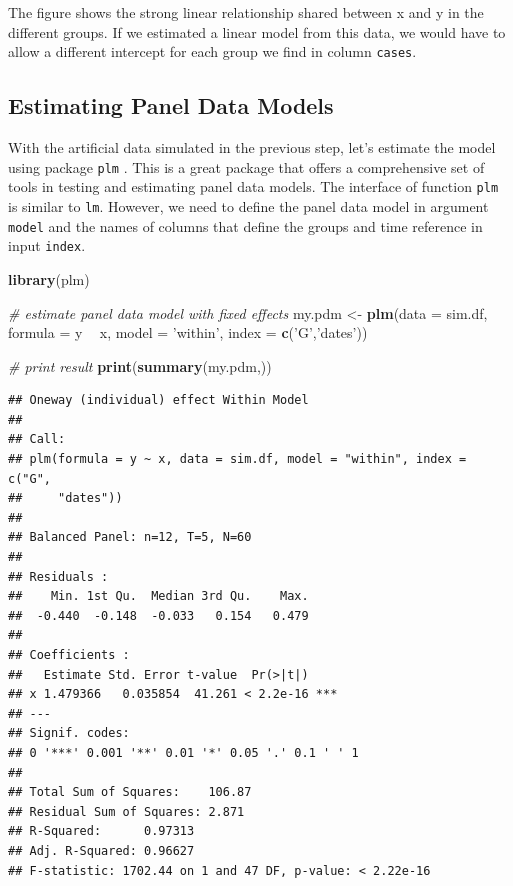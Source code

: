 \documentclass[11pt,]{book}
\newenvironment{Shaded}{\begin{snugshade}}{\end{snugshade}}
\newcommand{\KeywordTok}[1]{\textcolor[rgb]{0.27,0.27,0.27}{\textbf{#1}}}
\newcommand{\DataTypeTok}[1]{\textcolor[rgb]{0.27,0.27,0.27}{#1}}
\newcommand{\StringTok}[1]{\textcolor[rgb]{0.5,0.5,0.5}{#1}}
\newcommand{\CommentTok}[1]{\textcolor[rgb]{0.56,0.35,0.01}{\textit{#1}}}
\newcommand{\OperatorTok}[1]{\textcolor[rgb]{0.81,0.36,0.00}{\textbf{#1}}}
\newcommand{\NormalTok}[1]{#1}
\begin{document}
The figure shows the strong linear relationship shared between x and y
in the different groups. If we estimated a linear model from this data,
we would have to allow a different intercept for each group we find in
column \texttt{cases}.

\subsection{Estimating Panel Data
Models}\label{estimating-panel-data-models}

With the artificial data simulated in the previous step, let's estimate
the model using package \texttt{plm} \citep{plm}. This is a great
package that offers a comprehensive set of tools in testing and
estimating panel data models. The interface of function \texttt{plm} is
similar to \texttt{lm}. However, we need to define the panel data model
in argument \texttt{model} and the names of columns that define the
groups and time reference in input \texttt{index}. 

\begin{Shaded}
\begin{Highlighting}[]
\KeywordTok{library}\NormalTok{(plm)}

\CommentTok{# estimate panel data model with fixed effects}
\NormalTok{my.pdm <-}\StringTok{ }\KeywordTok{plm}\NormalTok{(}\DataTypeTok{data =}\NormalTok{ sim.df, }
              \DataTypeTok{formula =}\NormalTok{ y }\OperatorTok{~}\StringTok{ }\NormalTok{x, }
              \DataTypeTok{model =} \StringTok{'within'}\NormalTok{,}
              \DataTypeTok{index =} \KeywordTok{c}\NormalTok{(}\StringTok{'G'}\NormalTok{,}\StringTok{'dates'}\NormalTok{))}

\CommentTok{# print result}
\KeywordTok{print}\NormalTok{(}\KeywordTok{summary}\NormalTok{(my.pdm,))}
\end{Highlighting}
\end{Shaded}

\begin{verbatim}
## Oneway (individual) effect Within Model
## 
## Call:
## plm(formula = y ~ x, data = sim.df, model = "within", index = c("G", 
##     "dates"))
## 
## Balanced Panel: n=12, T=5, N=60
## 
## Residuals :
##    Min. 1st Qu.  Median 3rd Qu.    Max. 
##  -0.440  -0.148  -0.033   0.154   0.479 
## 
## Coefficients :
##   Estimate Std. Error t-value  Pr(>|t|)    
## x 1.479366   0.035854  41.261 < 2.2e-16 ***
## ---
## Signif. codes:  
## 0 '***' 0.001 '**' 0.01 '*' 0.05 '.' 0.1 ' ' 1
## 
## Total Sum of Squares:    106.87
## Residual Sum of Squares: 2.871
## R-Squared:      0.97313
## Adj. R-Squared: 0.96627
## F-statistic: 1702.44 on 1 and 47 DF, p-value: < 2.22e-16
\end{verbatim}
\end{document}
